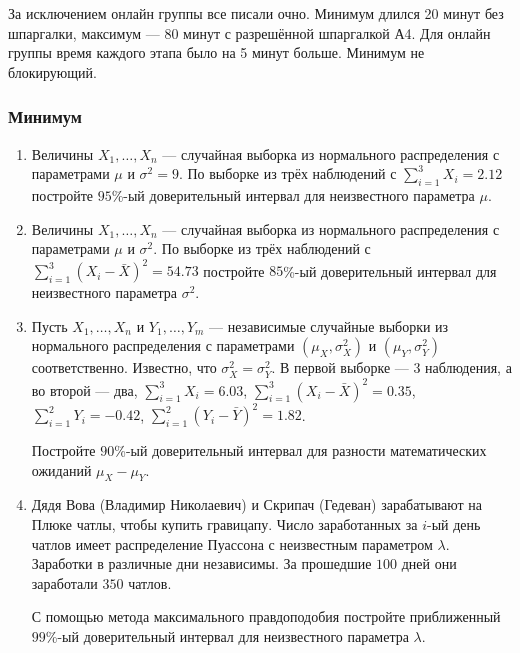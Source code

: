 За исключением онлайн группы все писали очно. Минимум длился 20 минут без шпаргалки, максимум — 80 минут с разрешённой шпаргалкой А4. 
Для онлайн группы время каждого этапа было на 5 минут больше. Минимум не блокирующий. 

\subsubsection*{Минимум}

\begin{enumerate}

	
	\item Величины $X_1, \ldots, X_n$ — случайная выборка из нормального распределения с параметрами $\mu$ и $\sigma^2 = 9$. 
	По выборке из трёх наблюдений с $\sum_{i=1}^3 X_i = 2.12$
	постройте $95$\%-ый доверительный интервал для неизвестного параметра $\mu$.
		
	\item Величины $X_1, \ldots, X_n$ — случайная выборка из нормального распределения с параметрами $\mu$ и $\sigma^2$. 
 	По выборке из трёх наблюдений с $\sum_{i=1}^3 (X_i - \bar X )^2 = 54.73$
	постройте $85$\%-ый доверительный интервал для неизвестного параметра $\sigma^2$.
	
	\item Пусть $X_1, \dots, X_n$ и $Y_1, \dots, Y_m$ — независимые случайные выборки из нормального распределения с параметрами $(\mu_X, \sigma_X^2)$ и $(\mu_Y, \sigma_Y^2)$ соответственно. 
	Известно, что $\sigma_X^2 = \sigma_Y^2$. В первой выборке — 3 наблюдения, а во второй — два, $\sum_{i=1}^3 X_i = 6.03$, 
	$\sum_{i=1}^3 (X_i - \bar X )^2 = 0.35$, $\sum_{i=1}^2 Y_i = -0.42$, 
	$\sum_{i=1}^2 (Y_i - \bar Y )^2 = 1.82$.
	
	Постройте $90$\%-ый доверительный интервал для разности математических ожиданий $\mu_X - \mu_Y$.
		
	\item Дядя Вова (Владимир Николаевич) и Скрипач (Гедеван) зарабатывают на Плюке чатлы, чтобы купить гравицапу. 
	Число заработанных за $i$-ый день чатлов имеет распределение Пуассона с неизвестным параметром $\lambda$. 
	Заработки в различные дни независимы. 
	За прошедшие $100$ дней они заработали $350$ чатлов.
	
	С помощью метода максимального правдоподобия постройте приближенный $99$\%-ый доверительный интервал для неизвестного параметра $\lambda$.
	
	\end{enumerate}
	

